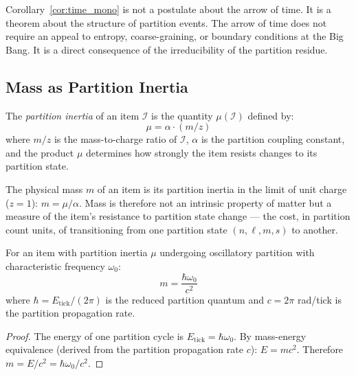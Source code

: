 Corollary~\ref{cor:time_mono} is not a postulate about the arrow of time. It is
a theorem about the structure of partition events. The arrow of time does not
require an appeal to entropy, coarse-graining, or boundary conditions at the Big
Bang. It is a direct consequence of the irreducibility of the partition residue.

\subsection{Mass as Partition Inertia}
\label{subsec:mass}

\begin{definition}
\label{def:inertia}
The \emph{partition inertia} of an item $\mathcal{I}$ is the quantity
$\mu(\mathcal{I})$ defined by:
\begin{equation}
    \mu = \alpha \cdot (m/z)
    \label{eq:inertia}
\end{equation}
where $m/z$ is the mass-to-charge ratio of $\mathcal{I}$, $\alpha$ is the
partition coupling constant, and the product $\mu$ determines how strongly the
item resists changes to its partition state.
\end{definition}

The physical mass $m$ of an item is its partition inertia in the limit of unit
charge ($z = 1$): $m = \mu/\alpha$. Mass is therefore not an intrinsic property
of matter but a measure of the item's resistance to partition state change ---
the cost, in partition count units, of transitioning from one partition state
$(n,\ell,m,s)$ to another.

\begin{theorem}
\label{thm:mass_freq}
For an item with partition inertia $\mu$ undergoing oscillatory partition with
characteristic frequency $\omega_0$:
\begin{equation}
    m = \frac{\hbar \omega_0}{c^2}
    \label{eq:mass_freq}
\end{equation}
where $\hbar = E_{\mathrm{tick}}/(2\pi)$ is the reduced partition quantum and
$c = 2\pi$ rad/tick is the partition propagation rate.
\end{theorem}

\begin{proof}
The energy of one partition cycle is $E_{\mathrm{tick}} = \hbar \omega_0$.
By mass-energy equivalence (derived from the partition propagation rate $c$):
$E = mc^2$. Therefore $m = E/c^2 = \hbar\omega_0/c^2$.
\end{proof}

